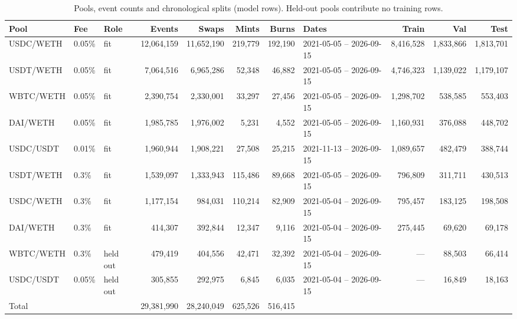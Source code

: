 \begin{table}[t]
\centering
\small
\caption{Pools, event counts and chronological splits (model rows). Held-out pools contribute no training rows.}
\label{tab:dataset}
\begin{adjustbox}{max width=\linewidth}
\begin{tabular}{lllrrrrlrrr}
\toprule
Pool & Fee & Role & Events & Swaps & Mints & Burns & Dates & Train & Val & Test \\
\midrule
USDC/WETH & 0.05\% & fit & 12,064,159 & 11,652,190 & 219,779 & 192,190 & 2021-05-05 – 2026-09-15 & 8,416,528 & 1,833,866 & 1,813,701 \\
USDT/WETH & 0.05\% & fit & 7,064,516 & 6,965,286 & 52,348 & 46,882 & 2021-05-05 – 2026-09-15 & 4,746,323 & 1,139,022 & 1,179,107 \\
WBTC/WETH & 0.05\% & fit & 2,390,754 & 2,330,001 & 33,297 & 27,456 & 2021-05-05 – 2026-09-15 & 1,298,702 & 538,585 & 553,403 \\
DAI/WETH & 0.05\% & fit & 1,985,785 & 1,976,002 & 5,231 & 4,552 & 2021-05-05 – 2026-09-15 & 1,160,931 & 376,088 & 448,702 \\
USDC/USDT & 0.01\% & fit & 1,960,944 & 1,908,221 & 27,508 & 25,215 & 2021-11-13 – 2026-09-15 & 1,089,657 & 482,479 & 388,744 \\
USDT/WETH & 0.3\% & fit & 1,539,097 & 1,333,943 & 115,486 & 89,668 & 2021-05-05 – 2026-09-15 & 796,809 & 311,711 & 430,513 \\
USDC/WETH & 0.3\% & fit & 1,177,154 & 984,031 & 110,214 & 82,909 & 2021-05-04 – 2026-09-15 & 795,457 & 183,125 & 198,508 \\
DAI/WETH & 0.3\% & fit & 414,307 & 392,844 & 12,347 & 9,116 & 2021-05-04 – 2026-09-15 & 275,445 & 69,620 & 69,178 \\
WBTC/WETH & 0.3\% & held out & 479,419 & 404,556 & 42,471 & 32,392 & 2021-05-04 – 2026-09-15 & — & 88,503 & 66,414 \\
USDC/USDT & 0.05\% & held out & 305,855 & 292,975 & 6,845 & 6,035 & 2021-05-04 – 2026-09-15 & — & 16,849 & 18,163 \\
\midrule
Total &  &  & 29,381,990 & 28,240,049 & 625,526 & 516,415 &  &  &  &  \\
\bottomrule
\end{tabular}
\end{adjustbox}
\end{table}
